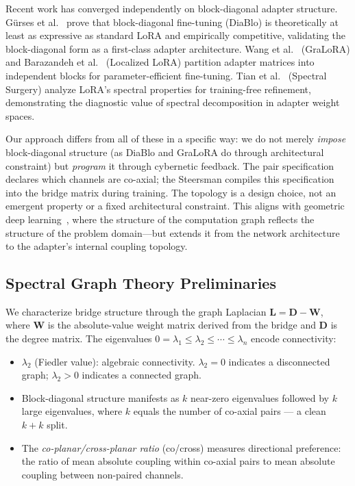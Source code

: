 Recent work has converged independently on block-diagonal adapter structure.
G{\"u}rses et al.~\cite{gurses2026diablo} prove that block-diagonal
fine-tuning (DiaBlo) is theoretically at least as expressive as standard
LoRA and empirically competitive, validating the block-diagonal form as a
first-class adapter architecture. Wang et al.~\cite{wang2025gralora}
(GraLoRA) and Barazandeh et al.~\cite{barazandeh2025localized} (Localized
LoRA) partition adapter matrices into independent blocks for
parameter-efficient fine-tuning. Tian et al.~\cite{tian2026spectral}
(Spectral Surgery) analyze LoRA's spectral properties for training-free
refinement, demonstrating the diagnostic value of spectral decomposition
in adapter weight spaces.

Our approach differs from all of these in a specific way: we do not merely
\emph{impose} block-diagonal structure (as DiaBlo and GraLoRA do through
architectural constraint) but \emph{program} it through cybernetic
feedback. The pair specification declares which channels are co-axial;
the Steersman compiles this specification into the bridge matrix during
training. The topology is a design choice, not an emergent property or
a fixed architectural constraint. This aligns with geometric deep
learning~\cite{bronstein2021geometric}, where the structure of the
computation graph reflects the structure of the problem domain---but
extends it from the network architecture to the adapter's internal
coupling topology.

\subsection{Spectral Graph Theory Preliminaries}

We characterize bridge structure through the graph Laplacian
$\mathbf{L} = \mathbf{D} - \mathbf{W}$, where $\mathbf{W}$ is the
absolute-value weight matrix derived from the bridge and $\mathbf{D}$ is
the degree matrix. The eigenvalues $0 = \lambda_1 \leq \lambda_2 \leq
\cdots \leq \lambda_n$ encode connectivity:

\begin{itemize}
  \item $\lambda_2$ (Fiedler value): algebraic connectivity. $\lambda_2 = 0$
    indicates a disconnected graph; $\lambda_2 > 0$ indicates a connected
    graph.
  \item Block-diagonal structure manifests as $k$ near-zero eigenvalues
    followed by $k$ large eigenvalues, where $k$ equals the number of
    co-axial pairs --- a clean $k{+}k$ split.
  \item The \emph{co-planar/cross-planar ratio} (co/cross) measures
    directional preference: the ratio of mean absolute coupling within
    co-axial pairs to mean absolute coupling between non-paired channels.
\end{itemize}

